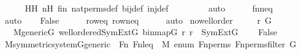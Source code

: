 \begin{isabellebody}
\ \ \ \ \isamarkupfalse%
\ HH\ nH\ fin\ nat{\isacharunderscore}{\kern0pt}perms{\isacharunderscore}{\kern0pt}def\ bij{\isacharunderscore}{\kern0pt}def\ inj{\isacharunderscore}{\kern0pt}def\ \isanewline
\ \ \ \ \ \ \isamarkupfalse%
\ auto{\isacharbrackleft}{\kern0pt}{}{\isacharbrackright}{\kern0pt}\isanewline
\ \ \ \ \isamarkupfalse%
\ fnneq\isanewline
\ \ \ \ \isamarkupfalse%
\ auto\isanewline
\isanewline
\ \ \isamarkupfalse%
\ False\isanewline
\ \ \ \ \isamarkupfalse%
\ roweq\ rowneq\isanewline
\ \ \ \ \isamarkupfalse%
\ auto\isanewline
{}\isamarkupfalse%
%
\endisatagproof
{\isafoldproof}%
%
\isadelimproof
\isanewline
%
\endisadelimproof
\isanewline
{}\isamarkupfalse%
\ no{\isacharunderscore}{\kern0pt}wellorder\ {\isacharcolon}{\kern0pt}\ \isanewline
\ \ \ r\ G\isanewline
\ \ \ {\isachardoublequoteopen}M{\isacharunderscore}{\kern0pt}generic{\isacharparenleft}{\kern0pt}G{\isacharparenright}{\kern0pt}{\isachardoublequoteclose}\ {\isachardoublequoteopen}wellordered{\isacharparenleft}{\kern0pt}{\isacharhash}{\kern0pt}{\isacharhash}{\kern0pt}SymExt{\isacharparenleft}{\kern0pt}G{\isacharparenright}{\kern0pt}{\isacharcomma}{\kern0pt}\ binmap{\isacharparenleft}{\kern0pt}G{\isacharparenright}{\kern0pt}{\isacharcomma}{\kern0pt}\ r{\isacharparenright}{\kern0pt}{\isachardoublequoteclose}\ {\isachardoublequoteopen}r\ {\isasymin}\ SymExt{\isacharparenleft}{\kern0pt}G{\isacharparenright}{\kern0pt}{\isachardoublequoteclose}\ \isanewline
\ \ \ False\isanewline
%
\isadelimproof
%
\endisadelimproof
%
\isatagproof
{}\isamarkupfalse%
\ {\isacharminus}{\kern0pt}\ \isanewline
\isanewline
\ \ \isamarkupfalse%
\ M{\isacharunderscore}{\kern0pt}symmetric{\isacharunderscore}{\kern0pt}system{\isacharunderscore}{\kern0pt}G{\isacharunderscore}{\kern0pt}generic\ \ {\isachardoublequoteopen}Fn{\isachardoublequoteclose}\ {\isachardoublequoteopen}Fn{\isacharunderscore}{\kern0pt}leq{\isachardoublequoteclose}\ {\isachardoublequoteopen}{}{\isachardoublequoteclose}\ {\isachardoublequoteopen}M{\isachardoublequoteclose}\ {\isachardoublequoteopen}enum{\isachardoublequoteclose}\ {\isachardoublequoteopen}Fn{\isacharunderscore}{\kern0pt}perms{\isachardoublequoteclose}\ {\isachardoublequoteopen}Fn{\isacharunderscore}{\kern0pt}perms{\isacharunderscore}{\kern0pt}filter{\isachardoublequoteclose}\ G\ \isanewline
\ \ \ \ \isamarkupfalse%

\end{isabellebody}
